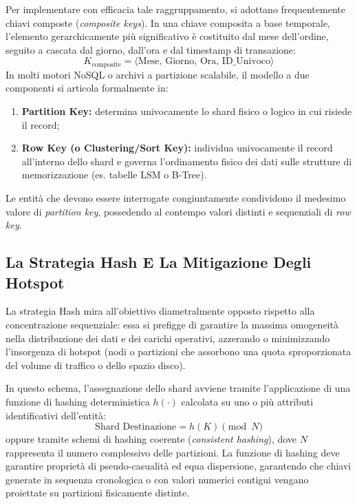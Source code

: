 \documentclass[11pt, a4paper]{article}
\begin{document}

Per implementare con efficacia tale raggruppamento, si adottano frequentemente chiavi composte (\emph{composite keys}). In una chiave composita a base temporale, l'elemento gerarchicamente più significativo è costituito dal mese dell'ordine, seguito a cascata dal giorno, dall'ora e dal timestamp di transazione:
\[
    K_{\text{composite}} = \langle \text{Mese}, \, \text{Giorno}, \, \text{Ora}, \, \text{ID\_Univoco} \rangle
\]
In molti motori NoSQL o archivi a partizione scalabile, il modello a due componenti si articola formalmente in:
\begin{enumerate}[noitemsep]
    \item \textbf{Partition Key:} determina univocamente lo shard fisico o logico in cui risiede il record;
    \item \textbf{Row Key (o Clustering/Sort Key):} individua univocamente il record all'interno dello shard e governa l'ordinamento fisico dei dati sulle strutture di memorizzazione (es. tabelle LSM o B-Tree).
\end{enumerate}
Le entità che devono essere interrogate congiuntamente condividono il medesimo valore di \emph{partition key}, possedendo al contempo valori distinti e sequenziali di \emph{row key}.

\subsection{La Strategia Hash E La Mitigazione Degli Hotspot}

La strategia Hash mira all'obiettivo diametralmente opposto rispetto alla concentrazione sequenziale: essa si prefigge di garantire la massima omogeneità nella distribuzione dei dati e dei carichi operativi, azzerando o minimizzando l'insorgenza di hotspot (nodi o partizioni che assorbono una quota sproporzionata del volume di traffico o dello spazio disco).

In questo schema, l'assegnazione dello shard avviene tramite l'applicazione di una funzione di hashing deterministica $h(\cdot)$ calcolata su uno o più attributi identificativi dell'entità:
\[
    \text{Shard Destinazione} = h(K) \pmod N
\]
oppure tramite schemi di hashing coerente (\emph{consistent hashing}), dove $N$ rappresenta il numero complessivo delle partizioni. La funzione di hashing deve garantire proprietà di pseudo-casualità ed equa dispersione, garantendo che chiavi generate in sequenza cronologica o con valori numerici contigui vengano proiettate su partizioni fisicamente distinte.
\end{document}
